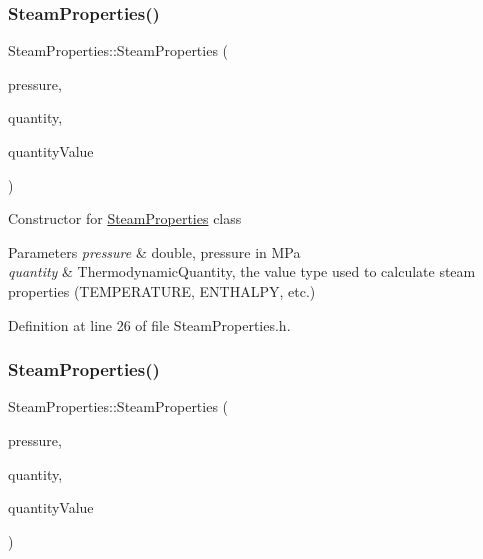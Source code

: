 \subsubsection{\texorpdfstring{Steam\+Properties()}{SteamProperties()}\hspace{0.1cm}{\footnotesize\ttfamily [2/3]}}
{\footnotesize\ttfamily Steam\+Properties\+::\+Steam\+Properties (\begin{DoxyParamCaption}\item[{const double}]{pressure,  }\item[{const \hyperlink{class_steam_properties_ae0294bedf7d178c2d8fb6aed0f62fbff}{Thermodynamic\+Quantity}}]{quantity,  }\item[{const double}]{quantity\+Value }\end{DoxyParamCaption})\hspace{0.3cm}{\ttfamily [inline]}}

Constructor for \hyperlink{class_steam_properties}{Steam\+Properties} class 
\begin{DoxyParams}{Parameters}
{\em pressure} & double, pressure in M\+Pa \\
\hline
{\em quantity} & Thermodynamic\+Quantity, the value type used to calculate steam properties (T\+E\+M\+P\+E\+R\+A\+T\+U\+RE, E\+N\+T\+H\+A\+L\+PY, etc.) \\
\hline
\end{DoxyParams}


Definition at line 26 of file Steam\+Properties.\+h.

\mbox{\label{class_steam_properties_a976e08ed0433943d469a8c2f75d2ac68}} 
\subsubsection{\texorpdfstring{Steam\+Properties()}{SteamProperties()}\hspace{0.1cm}{\footnotesize\ttfamily [3/3]}}
{\footnotesize\ttfamily Steam\+Properties\+::\+Steam\+Properties (\begin{DoxyParamCaption}\item[{const double}]{pressure,  }\item[{const \hyperlink{class_steam_properties_ae0294bedf7d178c2d8fb6aed0f62fbff}{Thermodynamic\+Quantity}}]{quantity,  }\item[{const double}]{quantity\+Value }\end{DoxyParamCaption})\hspace{0.3cm}{\ttfamily [inline]}}

